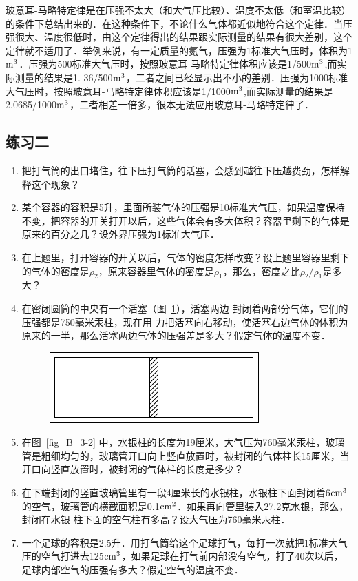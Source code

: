 玻意耳-马略特定律是在压强不太大（和大气压比较）、温度不太低（和室温比较）的条件下总结出来的．在这种条件下，不论什么气体都近似地符合这个定律．当压强很大、温度很低时，由这个定律得出的结果跟实际测量的结果有很大差别，这个定律就不适用了．举例来说，有一定质量的氦气，压强为1标准大气压时，体积为1${\rm m^3}$．压强为500标准大气压时，按照玻意耳-马略特定律体积应该是1/500${\rm m^3}$,而实际测量的结果是1. 36/500${\rm m^3}$，二者之间已经显示出不小的差别．压强为1000标准大气压时，按照玻意耳-马略特定律体积应该是1/1000${\rm m^3}$,而实际测量的结果是2.0685/1000${\rm m^3}$，二者相差一倍多，很本无法应用玻意耳-马略特定律了．


\subsection*{练习二}
\begin{enumerate}
        \item 把打气筒的出口堵住，往下压打气筒的活塞，会感到越往下压越费劲，怎样解释这个现象？
    \item 某个容器的容积是5升，里面所装气体的压强是10标准大气压，如果温度保持不变，把容器的开关打开以后，这些气体会有多大体积？容器里剩下的气体是原来的百分之几？设外界压强为1标准大气压．
    \item 在上题里，打开容器的开关以后，气体的密度怎样改变？设上题里容器里剩下的气体的密度是$\rho_2$，原来容器里气体的密度是$\rho_1$，那么，密度之比$\rho_2/\rho_1$是多大？
    \item 在密闭圆筒的中央有一个活塞（图~\ref{fig_B_3-8}），活塞两边
    封闭着两部分气体，它们的压强都是750毫米汞柱，现在用
    力把活塞向右移动，使活塞右边气体的体积为原来的一半，那么活塞两边气体的压强差是多大？假定气体的温度不变．
\begin{figure}[htbp]
    \centering
    \includegraphics{fig/B/3-8.pdf}
    \caption{}\label{fig_B_3-8}
\end{figure}

    \item 在图~\ref{fig_B_3-2} 中，水银柱的长度为19厘米，大气压为760毫米汞柱，玻璃管是粗细均匀的，玻璃管开口向上竖直放置时，被封闭的气体柱长15厘米，当开口向竖直放置时，被封闭的气体柱的长度是多少？
    \item 在下端封闭的竖直玻璃管里有一段4厘米长的水银柱，水银柱下面封闭着6${\rm cm^3}$的空气，玻璃管的横截面积是0.1${\rm cm^2}$．如果再向管里装入27.2克水银，那么，封闭在水银
 柱下面的空气柱有多高？设大气压为760毫米汞柱．
    \item 一个足球的容积是2.5升．用打气筒给这个足球打气，每打一次就把1标准大气压的空气打进去125${\rm cm^3}$，如果足球在打气前内部没有空气，打了40次以后，足球内部空气的压强有多大？假定空气的温度不变．
\end{enumerate}

